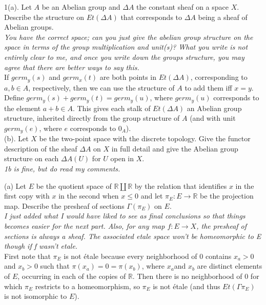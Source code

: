 1(a). Let $A$ be an Abelian group and $\Delta A$ the constant sheaf on a space $X$. Describe the structure on $Et(\Delta A)$ that corresponds to $\Delta A$ being a sheaf of Abelian groups. \\


\textit{You have the correct space; can you just give the abelian group structure on the space in terms of the group multiplication and unit(s)? What you write is not entirely clear to me, and once you write down the groups structure, you may agree that there are better ways to say this.}\\
  

If $germ_y(s)$ and $germ_x(t)$ are both points in $Et(\Delta A)$, corresponding to $a,b \in A$, respectively, then we can use the structure of $A$ to add them iff $x=y$. Define $germ_y(s) + germ_y(t) = germ_y(u)$, where $germ_y(u)$ corresponds to the element $a + b \in A$. This gives each stalk of $Et(\Delta A)$ an Abelian group structure, inherited directly from the group structure of $A$ (and with unit $germ_y(e)$, where $e$ corresponds to $0_A$).\\
  
  
(b). Let $X$ be the two-point space with the discrete topology. Give the functor description of the sheaf $\Delta A$ on $X$ in full detail and give the Abelian group structure on each $\Delta A(U)$ for $U$ open in $X$.\\

 \textit{1b is fine, but do read my comments.}

(a)  Let $E$ be the quotient space of $\mathbb{R} \amalg \mathbb{R}$ by the relation that identifies $x$ in the first copy with $x$ in the second when $x \leq 0$ and let $\pi_E: E \rightarrow \mathbb{R}$ be the projection map. Describe the presheaf of sections $\Gamma (\pi_E)$ on $E$.\\

\textit{I just added what I would have liked to see as final conclusions so that things becomes easier for the next part. Also, for any map $f:E \rightarrow X$, the presheaf of sections is always a sheaf. The associated etale space won't be homeomorphic to E though if f wasn't etale.}\\

First note that $\pi_E$ is not \'etale because every neighborhood of $0$ contains $x_a > 0$ and $x_b > 0$ such that $\pi(x_a) = 0 = \pi(x_b)$, where $x_a$and $x_b$ are distinct elements of $E$, occurring in each of the copies of $\mathbb{R}$. Then there is no neighborhood of $0$ for which $\pi_E$ restricts to a  homeomorphism, so $\pi_E$ is not \'etale (and thus $Et(\Gamma \pi_E)$ is not isomorphic to $E$).\\

